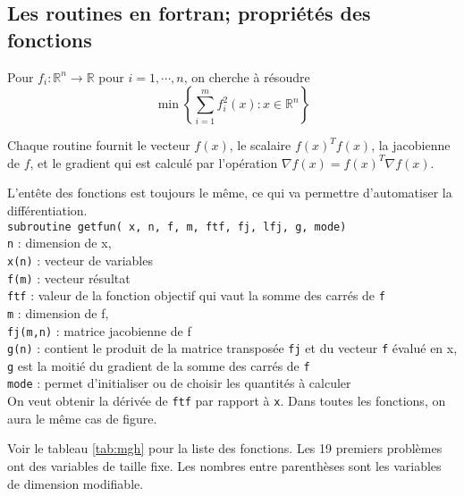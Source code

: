 \subsection{Les routines en fortran; propri\'et\'es des fonctions}


Pour $f_i : \mathbb{R}^n \rightarrow \mathbb{R}$ pour $i=1, \cdots ,n$, on cherche \`a r\'esoudre
$$\min \left\{\sum_{i=1}^{m}f_i^2(x):x \in \mathbb{R}^n \right\} $$

Chaque routine fournit le vecteur $f(x)$, le scalaire $f(x)^Tf(x)$, la jacobienne de $f$, et le gradient qui est calcul\'e par
l'op\'eration $ \nabla f(x)=f(x)^T\nabla f(x)$.



L'entête des fonctions est toujours le même, ce qui va permettre d'automatiser la diff\'erentiation.\\
{\center\tt subroutine getfun( x, n, f, m, ftf, fj, lfj, g, mode)}\\
{\tt n} : dimension de x, \\
{\tt x(n)} : vecteur de variables\\
{\tt f(m)} : vecteur r\'esultat \\
{\tt ftf} : valeur de la fonction objectif qui vaut la somme des carr\'es de {\tt f}\\
{\tt m} : dimension de f, \\
{\tt fj(m,n)} : matrice jacobienne de f\\
{\tt g(n)} : contient le produit de la matrice transpos\'ee {\tt fj} et du vecteur {\tt f} \'evalu\'e en x,
{\tt g} est la moiti\'e du gradient de la somme des carr\'es de {\tt f}\\
{\tt mode} : permet d'initialiser ou de choisir les quantit\'es \`a calculer\\


On veut obtenir la d\'eriv\'ee de {\tt ftf} par rapport \`a {\tt x}. Dans toutes les fonctions, on aura le même cas de figure.




Voir le tableau \ref{tab:mgh} pour la liste des fonctions. Les 19 premiers probl\`emes ont des variables de taille fixe. Les nombres
entre parenth\`eses sont les variables de dimension modifiable.


